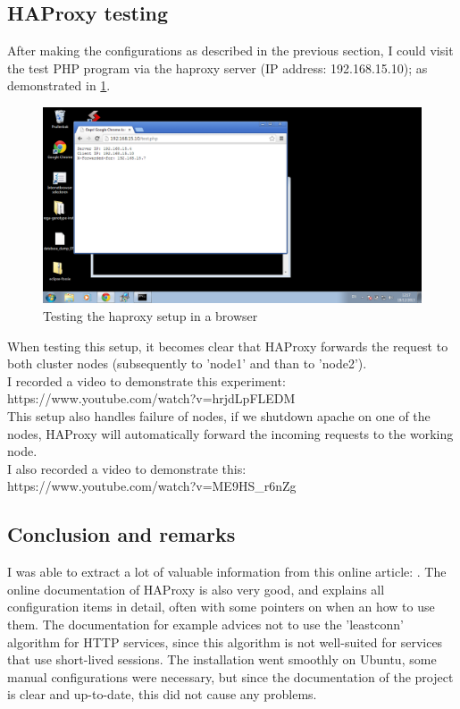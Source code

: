 \documentclass[12pt]{report}
\begin{document}
\subsection{HAProxy testing}
After making the configurations as described in the previous section, I could visit the test PHP program via the
haproxy server (IP address: 192.168.15.10); as demonstrated in 
\cref{fig:haproxy_working_browser}.

\begin{figure}[h!]
  \caption{Testing the haproxy setup in a browser}
  \label{fig:haproxy_working_browser}
  \centering
    \includegraphics[scale=0.3]{pics/haproxy_working_browser.png}
\end{figure}

When testing this setup, it becomes clear that HAProxy forwards the
request to both cluster nodes (subsequently to 'node1' and than to
'node2').\\
I recorded a video to demonstrate this experiment: \\
https://www.youtube.com/watch?v=hrjdLpFLEDM \\

This setup also handles failure of nodes, if we shutdown apache on one
of the nodes, HAProxy will automatically forward the incoming requests
to the working node. \\
I also recorded a video to demonstrate this: \\
https://www.youtube.com/watch?v=ME9HS\_r6nZg

\subsection{Conclusion and remarks}
I was able to extract a lot of valuable information from this online
article: \cite{haproxy_install_tutorial}. The online documentation of
 HAProxy \cite{haproxy:2013} is also very good, and explains all
 configuration items in detail, often with some pointers on when an
 how to use them. The documentation for example advices not to use the
 'leastconn' algorithm for HTTP services, since this algorithm is not
 well-suited for services that use short-lived sessions.
The installation went smoothly on Ubuntu, some manual configurations
were necessary, but since the documentation of the project is clear
and up-to-date, this did not cause any problems.
\end{document}
